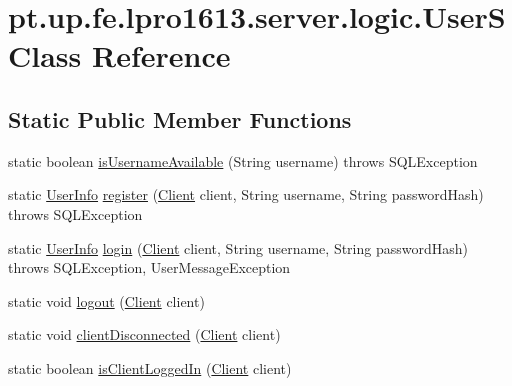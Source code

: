 \hypertarget{classpt_1_1up_1_1fe_1_1lpro1613_1_1server_1_1logic_1_1_user_s}{}\section{pt.\+up.\+fe.\+lpro1613.\+server.\+logic.\+UserS Class Reference}
\label{classpt_1_1up_1_1fe_1_1lpro1613_1_1server_1_1logic_1_1_user_s}
\subsection*{Static Public Member Functions}
\begin{DoxyCompactItemize}
\item 
static boolean \hyperlink{classpt_1_1up_1_1fe_1_1lpro1613_1_1server_1_1logic_1_1_user_s_a9c89c0a0ef730b38021033e58f7911cd}{is\+Username\+Available} (String username)  throws S\+Q\+L\+Exception 
\item 
static \hyperlink{classpt_1_1up_1_1fe_1_1lpro1613_1_1sharedlib_1_1structs_1_1_user_info}{User\+Info} \hyperlink{classpt_1_1up_1_1fe_1_1lpro1613_1_1server_1_1logic_1_1_user_s_ae46d3839ba68eb377aff71f23e3b3936}{register} (\hyperlink{classpt_1_1up_1_1fe_1_1lpro1613_1_1server_1_1conn_1_1_client}{Client} client, String username, String password\+Hash)  throws S\+Q\+L\+Exception 
\item 
static \hyperlink{classpt_1_1up_1_1fe_1_1lpro1613_1_1sharedlib_1_1structs_1_1_user_info}{User\+Info} \hyperlink{classpt_1_1up_1_1fe_1_1lpro1613_1_1server_1_1logic_1_1_user_s_a501230613cfd4f8fee1949c3f116f0ac}{login} (\hyperlink{classpt_1_1up_1_1fe_1_1lpro1613_1_1server_1_1conn_1_1_client}{Client} client, String username, String password\+Hash)  throws S\+Q\+L\+Exception, User\+Message\+Exception 
\item 
static void \hyperlink{classpt_1_1up_1_1fe_1_1lpro1613_1_1server_1_1logic_1_1_user_s_ade6f87a4adfd727f4fceca4f9ac17362}{logout} (\hyperlink{classpt_1_1up_1_1fe_1_1lpro1613_1_1server_1_1conn_1_1_client}{Client} client)
\item 
static void \hyperlink{classpt_1_1up_1_1fe_1_1lpro1613_1_1server_1_1logic_1_1_user_s_afca9c18f164a1006c2411b8e283ec4fb}{client\+Disconnected} (\hyperlink{classpt_1_1up_1_1fe_1_1lpro1613_1_1server_1_1conn_1_1_client}{Client} client)
\item 
static boolean \hyperlink{classpt_1_1up_1_1fe_1_1lpro1613_1_1server_1_1logic_1_1_user_s_abe3cf61bff09cb09e3ed0a5564e98257}{is\+Client\+Logged\+In} (\hyperlink{classpt_1_1up_1_1fe_1_1lpro1613_1_1server_1_1conn_1_1_client}{Client} client)

\end{DoxyCompactItemize}
